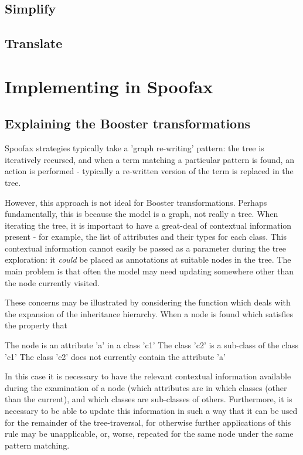\subsection{Simplify}
\subsection{Translate}
  
\section{Implementing in Spoofax}

\subsection{Explaining the Booster transformations}

Spoofax strategies typically take a 'graph re-writing' pattern: the
tree is iteratively recursed, and when a term matching a particular
pattern is found, an action is performed - typically a re-written
version of the term is replaced in the tree.

However, this approach is not ideal for Booster transformations.
Perhaps fundamentally, this is because the model is a graph, not
really a tree.  When iterating the tree, it is important to have a
great-deal of contextual information present - for example, the list
of attributes and their types for each class.  This contextual
information cannot easily be passed as a parameter during the tree
exploration: it \emph{could} be placed as annotations at suitable nodes in
the tree.  The main problem is that often the model may need updating
somewhere other than the node currently visited.  

These concerns may be illustrated by considering the function which
deals with the expansion of the inheritance hierarchy.  When a node is
found which satisfies the property that

The node is an attribute 'a' in a class 'c1'
The class 'c2' is a sub-class of the class 'c1'
The class 'c2' does not currently contain the attribute 'a'

In this case it is necessary to have the relevant contextual
information available during the examination of a node (which
attributes are in which classes (other than the current), and which
classes are sub-classes of others.  Furthermore, it is necessary to be
able to update this information in such a way that it can be used for
the remainder of the tree-traversal, for otherwise further
applications of this rule may be unapplicable, or, worse, repeated for
the same node under the same pattern matching.

